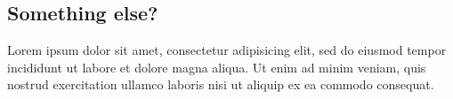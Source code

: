 \subsection{Something else?}
\begin{DRAFT}
Lorem ipsum dolor sit amet, consectetur adipisicing elit, sed do eiusmod tempor incididunt ut labore et dolore magna aliqua. Ut enim ad minim veniam, quis nostrud exercitation ullamco laboris nisi ut aliquip ex ea commodo consequat.
\end{DRAFT}
    
